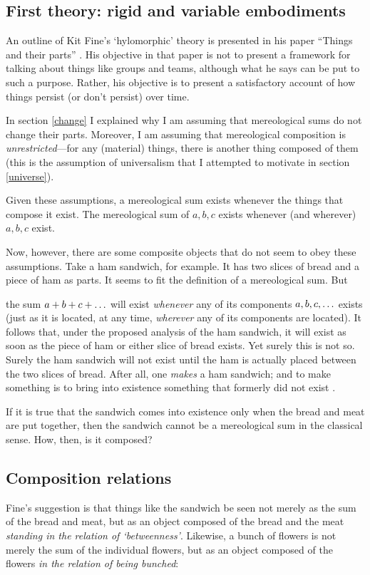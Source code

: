\documentclass[11pt]{article}
\newenvironment{squote}{%
\begin{spacing}{1}
\begin{list}{}{%
\setlength{\labelwidth}{0pt}%
\rightmargin\leftmargin%
}
\item\relax
}{%
\end{list}%
\end{spacing}
}
\begin{document}
\begin{spacing}{1.5}
\section{First theory: rigid and variable embodiments}
\label{fine-h}
An outline of Kit Fine's `hylomorphic' theory is presented in his
paper ``Things and their parts'' \citeyearpar{fine1999}.  His
objective in that paper is not to present a framework for talking
about things like groups and teams, although what he says can be put
to such a purpose.  Rather, his objective is to present a satisfactory
account of how things persist (or don't persist) over time.

In section \ref{change} I explained why I am assuming that
mereological sums do not change their parts.  Moreover, I am assuming
that mereological composition is {\em unrestricted}---for any
(material) things, there is another thing composed of them (this is
the assumption of universalism that I attempted to motivate in section
\ref{universe}).

Given these assumptions, a mereological sum exists whenever the things
that compose it exist.  The mereological sum of $a, b, c$ exists
whenever (and wherever) $a, b, c$ exist.

Now, however, there are some composite objects that do not seem to
obey these assumptions.  Take a ham sandwich, for example.  It has two
slices of bread and a piece of ham as parts.  It seems to fit the
definition of a mereological sum.  But

\begin{squote}
the sum $a + b + c + \mathellipsis $ will exist {\em whenever} any of
its components $a, b, c, \mathellipsis $ exists (just as it is
located, at any time, {\em wherever} any of its components are
located).  It follows that, under the proposed analysis of the ham
sandwich, it will exist as soon as the piece of ham or either slice of
bread exists.  Yet surely this is not so.  Surely the ham sandwich
will not exist until the ham is actually placed between the two slices
of bread.  After all, one {\em makes} a ham sandwich; and to make
something is to bring into existence something that formerly did not
exist \citep[62]{fine1999}.
\end{squote}

If it is true that the sandwich comes into existence only when the
bread and meat are put together, then the sandwich cannot be a
mereological sum in the classical sense.  How, then, is it composed?

\subsection{Composition relations}
\label{rigid}
Fine's suggestion is that things like the sandwich be seen not merely
as the sum of the bread and meat, but as an object composed of the
bread and the meat {\em standing in the relation of `betweenness'}.
Likewise, a bunch of flowers is not merely the sum of the individual
flowers, but as an object composed of the flowers {\em in the relation
  of being bunched}:


\end{spacing}
\end{document}
